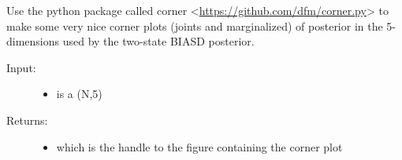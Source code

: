\documentclass[letterpaper,10pt,english]{sphinxmanual}
\begin{document}

\begin{fulllineitems}
\label{code_mcmc:mcmc.plot_corner}
Use the python package called corner \textless{}\url{https://github.com/dfm/corner.py}\textgreater{} to make some very nice corner plots (joints and marginalized) of posterior in the 5-dimensions used by the two-state BIASD posterior.
\begin{description}
\item[{Input:}] \leavevmode\begin{itemize}
\item {} 
 is a (N,5) 

\end{itemize}

\item[{Returns:}] \leavevmode\begin{itemize}
\item {} 
 which is the handle to the figure containing the corner plot

\end{itemize}

\end{description}

\end{fulllineitems}

\end{document}
